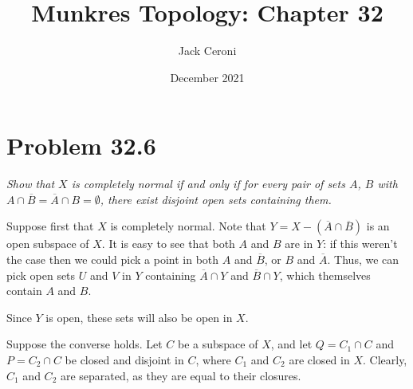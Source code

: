 \documentclass[10pt, oneside]{amsart}
\title{Munkres Topology: Chapter 32}
\author{Jack Ceroni}
\date{December 2021}
\begin{document}
    \maketitle

    \tableofcontents

    \vspace{.25in}

    \newpage

    \hrulefill

    \section{Problem 32.6}

    \textit{Show that $X$ is completely normal if and only if for every pair of sets $A$, $B$ with $A \cap \overline{B} = \overline{A} \cap B = \emptyset$, there exist disjoint open sets containing them.}
    \newline

    Suppose first that $X$ is completely normal. Note that $Y = X - (\overline{A} \cap \overline{B})$ is an open subspace of $X$. It is easy to see that both $A$ and $B$ are in $Y$: if this weren't the case then
    we could pick a point in both $A$ and $\overline{B}$, or $B$ and $\overline{A}$. Thus, we can pick open sets $U$ and $V$ in $Y$ containing $\overline{A} \cap Y$ and $\overline{B} \cap Y$, which themselves contain $A$ and $B$.
    \newline

    Since $Y$ is open, these sets will also be open in $X$.
    \newline

    Suppose the converse holds. Let $C$ be a subspace of $X$, and let $Q = C_1 \cap C$ and $P = C_2 \cap C$ be closed and disjoint in $C$, where $C_1$ and $C_2$ are closed
    in $X$. Clearly, $C_1$ and $C_2$ are separated, as they are equal to their closures.

    \hrulefill

    
\end{document}
